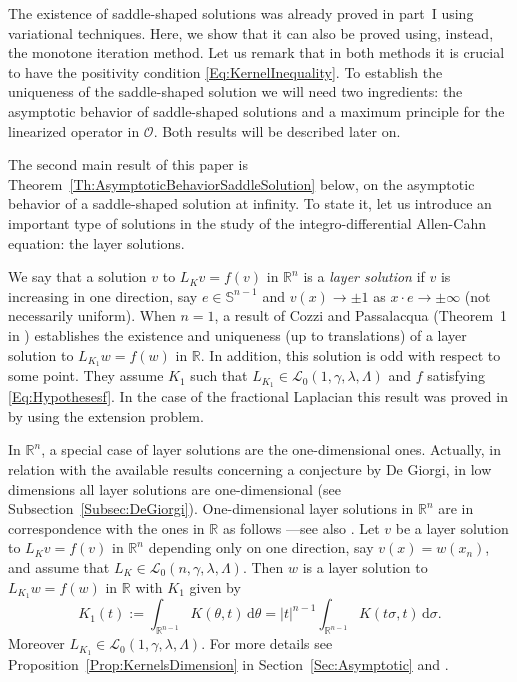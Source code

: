 \documentclass[12pt,reqno]{amsart}
\theoremstyle{definition}
\theoremstyle{remark}
\newcommand{\con}[1]{\mathbb{#1}}
\newcommand{\R}{\con{R}} %
\newcommand{\Sph}{\con{S}} %
\newcommand{\lcal}{\mathcal{L}}
\newcommand{\ocal}{\mathcal{O}}
\newcommand{\s}{\gamma}
\renewcommand{\d}{\,\mathrm{d}} %
\numberwithin{equation}{section}
\begin{document}
The existence of saddle-shaped solutions was already proved in part~I \cite{FelipeSanz-Perela:IntegroDifferentialI} using variational techniques. Here, we show that it can also be proved using, instead, the monotone iteration method. Let us remark that in both methods it is crucial to have the positivity condition \eqref{Eq:KernelInequality}. To establish the uniqueness of the saddle-shaped solution we will need two ingredients: the asymptotic behavior of saddle-shaped solutions and a maximum principle for the linearized operator in $\ocal$. Both results will be described later on.


The second main result of this paper is Theorem~\ref{Th:AsymptoticBehaviorSaddleSolution} below, on the asymptotic behavior of a saddle-shaped solution at infinity. To state it, let us introduce an important type of solutions in the study of the integro-differential Allen-Cahn equation: the layer solutions.


We say that a solution $v$ to $L_K v = f(v)$ in $\R^n$ is a \emph{layer solution} if $v$ is increasing in one direction, say $e\in \Sph^{n-1}$ and $v(x) \to \pm 1$ as $x\cdot e \to \pm \infty$ (not necessarily uniform). When $n=1$, a result of Cozzi and Passalacqua (Theorem~1 in \cite{CozziPassalacqua}) establishes the existence and uniqueness (up to translations) of a layer solution to  $L_{K_1} w = f(w)$ in $\R$. In addition, this solution is odd with respect to some point. They assume $K_1$ such that $L_{K_1}\in \lcal_0(1,\s,\lambda, \Lambda)$ and $f$ satisfying \eqref{Eq:Hypothesesf}. In the case of the fractional Laplacian this result was proved in \cite{CabreSolaMorales,CabreSireII} by using the extension problem.

In $\R^n$, a special case of layer solutions are the one-dimensional ones. Actually, in relation with the available results concerning a conjecture by De Giorgi, in low dimensions all layer solutions are one-dimensional (see Subsection~\ref{Subsec:DeGiorgi}). One-dimensional layer solutions in $\R^n$ are in correspondence with the ones in $\R$ as follows ---see also \cite{CozziPassalacqua}. Let $v$ be a layer solution to $L_K v = f(v)$ in $\R^n$ depending only on one direction, say $v(x) = w(x_n)$, and assume that $L_{K}\in \lcal_0(n,\s,\lambda, \Lambda)$. Then $w$ is a layer solution to $L_{K_1} w = f(w)$ in $\R$ with $K_1$ given by
$$
K_1(t) := \int_{\R^{n-1}} K\left(\theta,t\right) \d \theta = |t|^{n-1} \int_{\R^{n-1}} K\left(t\sigma,t\right) \d \sigma.
$$
Moreover $L_{K_1}\in \lcal_0(1,\s,\lambda, \Lambda)$. For more details see Proposition~\ref{Prop:KernelsDimension} in Section~\ref{Sec:Asymptotic} and \cite{CozziPassalacqua}. 
\end{document}
